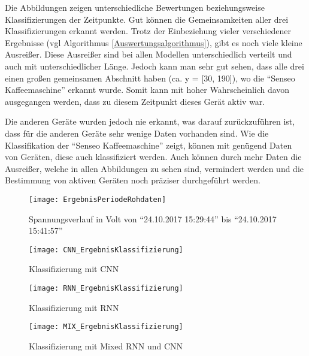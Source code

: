         \noindent
        Die Abbildungen zeigen unterschiedliche Bewertungen beziehungsweise Klassifizierungen der Zeitpunkte.
        Gut können die Gemeinsamkeiten aller drei Klassifizierungen erkannt werden.
        Trotz der Einbeziehung vieler verschiedener Ergebnisse (vgl Algorithmus \ref{Auswertungsalgorithmus}), gibt es noch viele kleine Ausreißer.
        Diese Ausreißer sind bei allen Modellen unterschiedlich verteilt und auch mit unterschiedlicher Länge.
        Jedoch kann man sehr gut sehen, dass alle drei einen großen gemeinsamen Abschnitt haben (ca. y = [30, 190]), wo die "`Senseo Kaffeemaschine"' erkannt wurde.
        Somit kann mit hoher Wahrscheinlich davon ausgegangen werden, dass zu diesem Zeitpunkt dieses Gerät aktiv war.
        \newline

        \noindent
        Die anderen Geräte wurden jedoch nie erkannt, was darauf zurückzuführen ist, dass für die anderen Geräte sehr wenige Daten vorhanden sind.
        Wie die Klassifikation der "`Senseo Kaffeemaschine"' zeigt, können mit genügend Daten von Geräten, diese auch klassifiziert werden.
        Auch können durch mehr Daten die Ausreißer, welche in allen Abbildungen zu sehen sind, vermindert werden und die Bestimmung von aktiven Geräten noch präziser durchgeführt werden.      
        
        \begin{figure}[H]
            \centering
            \texttt{[image: ErgebnisPeriodeRohdaten]}
            \caption{Spannungsverlauf in Volt von "`24.10.2017 15:29:44"' bis "`24.10.2017 15:41:57"'}
            \label{fig:ResultClassificationPeriod}
        \end{figure}

        \begin{figure}[H]
            \centering
            \texttt{[image: CNN\_ErgebnisKlassifizierung]}
            \caption{Klassifizierung mit CNN}
            \label{fig:CNN_RawClassification}
        \end{figure}

        \begin{figure}[H]
            \centering
            \texttt{[image: RNN\_ErgebnisKlassifizierung]}
            \caption{Klassifizierung mit RNN}
            \label{fig:RNN_RawClassification}
        \end{figure}

        \begin{figure}[H]
            \centering
            \texttt{[image: MIX\_ErgebnisKlassifizierung]}
            \caption{Klassifizierung mit Mixed RNN und CNN}
            \label{fig:MIX_RawClassification}
        \end{figure}

